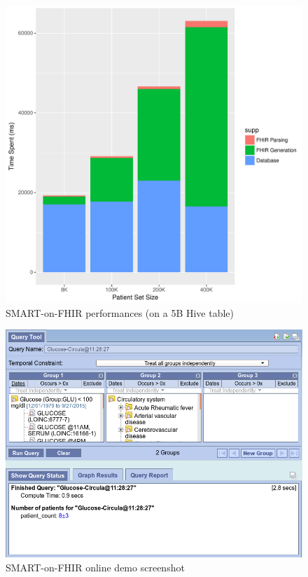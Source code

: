 \documentclass{amia}
\begin{document}
\begin{figure}[h]
\centering
\includegraphics[scale=.7]{graph1.pdf}
	\caption{SMART-on-FHIR performances (on a 5B Hive table)}
\label{fig2}
\end{figure}
\begin{figure}[h]
\centering
\includegraphics[scale=.5]{demo.png}
	\caption{SMART-on-FHIR online demo screenshot}
\label{fig3}
\end{figure}
\end{document}

